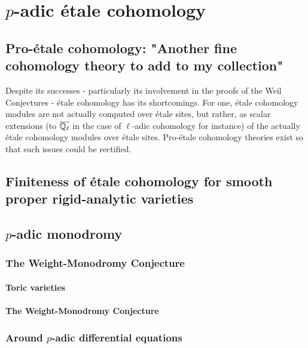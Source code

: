 \chapter{\texorpdfstring{$p$}{}-adic \'etale cohomology}
    \begin{abstract}
        
    \end{abstract}
    
    \minitoc
    
    \section{Pro-\'etale cohomology: "Another fine cohomology theory to add to my collection"}
        Despite its successes - particularly its involvement in the proofs of the Weil Conjectures - \'etale cohomology has its shortcomings. For one, \'etale cohomology modules are not actually computed over \'etale sites, but rather, as scalar extensions (to $\overline{\mathbb{Q}_{\ell}}$ in the case of $\ell$-adic cohomology for instance) of the actually \'etale cohomology modules over \'etale sites. Pro-\'etale cohomology theories exist so that such issues could be rectified. 
        
    \section{Finiteness of \'etale cohomology for smooth proper rigid-analytic varieties}
        
    \section{\texorpdfstring{$p$}{}-adic monodromy}
        \subsection{The Weight-Monodromy Conjecture}
            \subsubsection{Toric varieties}
            
            \subsubsection{The Weight-Monodromy Conjecture}
            
        \subsection{Around \texorpdfstring{$p$}{}-adic differential equations}